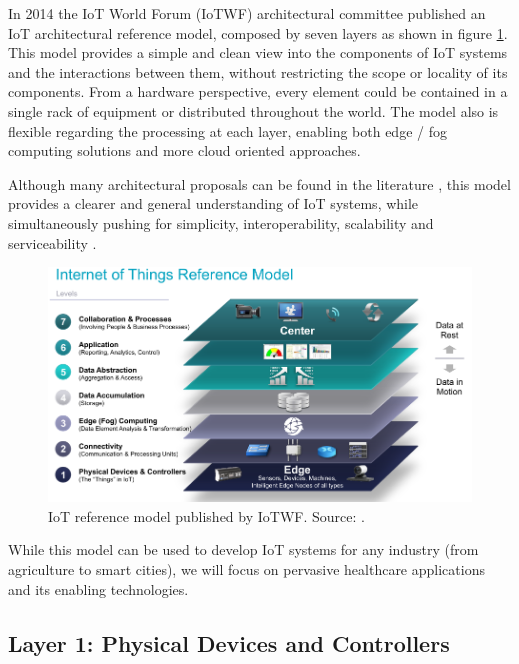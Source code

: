 In 2014 the \acs{IoT} World Forum (IoTWF) architectural committee published an \acs{IoT} architectural reference model, composed by seven layers as shown in figure \ref{fig:iotwf-referencemodel}. This model provides a simple and clean view into the components of IoT systems and the interactions between them, without restricting the scope or locality of its components. From a hardware perspective, every element could be contained in a single rack of equipment or distributed throughout the world. The model also is flexible regarding the processing at each layer, enabling both edge / fog computing solutions and more cloud oriented approaches.

Although many architectural proposals can be found in the literature \cite{Wu2020, Rubi2019, Catarinucci2015, Zhang2018, Gope2016, Tennina2014}, this model provides a clearer and general understanding of IoT systems, while simultaneously pushing for simplicity, interoperability, scalability and serviceability \cite{Cisco2014}.

\begin{figure}[H]
    \centering
    \includegraphics[width=0.85\linewidth]{images/iotwf-referencemodel.png}
    \caption[IoT reference model published by IoTWF.]{IoT reference model published by IoTWF. Source: \cite{Cisco2014}.}
    \label{fig:iotwf-referencemodel}
\end{figure}

While this model can be used to develop IoT systems for any industry (from agriculture to smart cities), we will focus on pervasive healthcare applications and its enabling technologies. 


\subsection{Layer 1: Physical Devices and Controllers}
\label{sec:iot-model-layer1}

